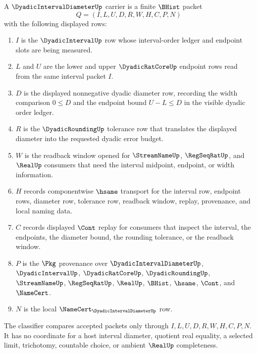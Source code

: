 \begin{definition}
\label{def:dyadic-interval-diameter-carrier}
A $\DyadicIntervalDiameterUp$ carrier is a finite $\BHist$ packet
$$
Q=(I,L,U,D,R,W,H,C,P,N)
$$
with the following displayed rows:
\begin{enumerate}
\item $I$ is the $\DyadicIntervalUp$ row whose interval-order ledger and endpoint slots are being measured.
\item $L$ and $U$ are the lower and upper $\DyadicRatCoreUp$ endpoint rows read from the same interval packet $I$.
\item $D$ is the displayed nonnegative dyadic diameter row, recording the width comparison $0\leq D$ and the endpoint bound $U-L\leq D$ in the visible dyadic order ledger.
\item $R$ is the $\DyadicRoundingUp$ tolerance row that translates the displayed diameter into the requested dyadic error budget.
\item $W$ is the readback window opened for $\StreamNameUp$, $\RegSeqRatUp$, and $\RealUp$ consumers that need the interval midpoint, endpoint, or width information.
\item $H$ records componentwise $\hsame$ transport for the interval row, endpoint rows, diameter row, tolerance row, readback window, replay, provenance, and local naming data.
\item $C$ records displayed $\Cont$ replay for consumers that inspect the interval, the endpoints, the diameter bound, the rounding tolerance, or the readback window.
\item $P$ is the $\Pkg$ provenance over $\DyadicIntervalDiameterUp$, $\DyadicIntervalUp$, $\DyadicRatCoreUp$, $\DyadicRoundingUp$, $\StreamNameUp$, $\RegSeqRatUp$, $\RealUp$, $\BHist$, $\hsame$, $\Cont$, and $\NameCert$.
\item $N$ is the local $\NameCert_{\DyadicIntervalDiameterUp}$ row.
\end{enumerate}
The classifier compares accepted packets only through $I,L,U,D,R,W,H,C,P,N$. It has no coordinate for a host interval diameter, quotient real equality, a selected limit, trichotomy, countable choice, or ambient $\RealUp$ completeness.
\end{definition}

